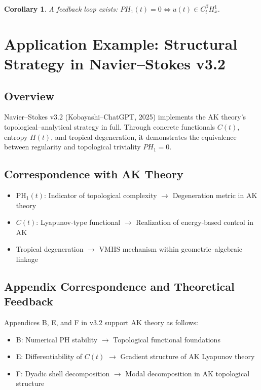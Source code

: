 \documentclass[11pt]{article}
\newtheorem{corollary}[theorem]{Corollary}
\begin{document}
\begin{corollary}
A feedback loop exists: \(PH_1(t) = 0 \iff u(t) \in C^\beta_t H^1_x\).
\end{corollary}

\section{Application Example: Structural Strategy in Navier–Stokes v3.2}
\subsection{Overview}
Navier–Stokes v3.2 (Kobayashi–ChatGPT, 2025) implements the AK theory's topological–analytical strategy in full. Through concrete functionals \(C(t)\), entropy \(H(t)\), and tropical degeneration, it demonstrates the equivalence between regularity and topological triviality \(PH_1 = 0\).

\subsection{Correspondence with AK Theory}
\begin{itemize}
  \item PH\(_1(t)\): Indicator of topological complexity \(\rightarrow\) Degeneration metric in AK theory
  \item \(C(t)\): Lyapunov-type functional \(\rightarrow\) Realization of energy-based control in AK
  \item Tropical degeneration \(\rightarrow\) VMHS mechanism within geometric–algebraic linkage
\end{itemize}

\subsection{Appendix Correspondence and Theoretical Feedback}
Appendices B, E, and F in v3.2 support AK theory as follows:
\begin{itemize}
  \item B: Numerical PH stability \(\rightarrow\) Topological functional foundations
  \item E: Differentiability of \(C(t)\) \(\rightarrow\) Gradient structure of AK Lyapunov theory
  \item F: Dyadic shell decomposition \(\rightarrow\) Modal decomposition in AK topological structure
\end{itemize}
\end{document}
